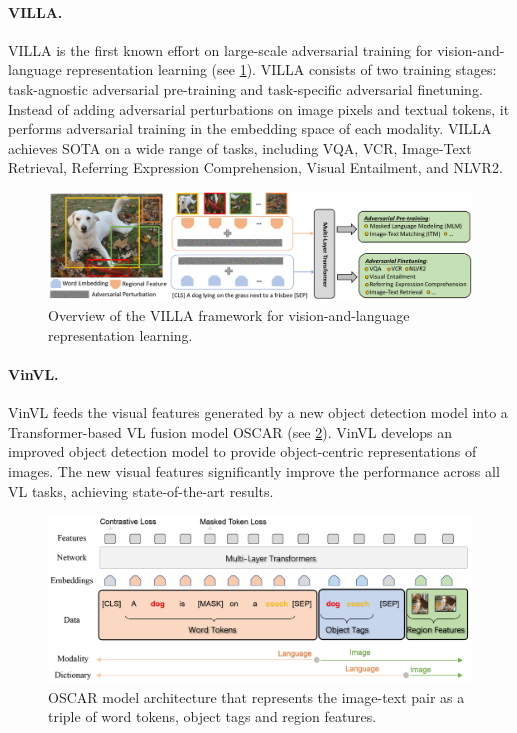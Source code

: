 \paragraph{VILLA.} VILLA \cite{gan2020villa} is the first known effort on large-scale adversarial training for vision-and-language representation learning (see \cref{fig:villa}). VILLA consists of two training stages: task-agnostic adversarial pre-training and task-specific adversarial finetuning. Instead of adding adversarial perturbations on image pixels and textual tokens, it performs adversarial training in the embedding space of each modality. VILLA achieves SOTA on a wide range of tasks, including VQA, VCR, Image-Text Retrieval, Referring Expression Comprehension, Visual Entailment, and NLVR2.

\begin{figure}[ht]
    \centering
    \includegraphics[width=\linewidth]{images/models/villa.png}
    \caption{Overview of the VILLA framework for vision-and-language representation learning.}
    \label{fig:villa}
\end{figure}

\paragraph{VinVL.} VinVL \cite{zhang2021vinvl} feeds the visual features generated by a new object detection model into a Transformer-based VL fusion model OSCAR \cite{li2020oscar} (see \cref{fig:oscar}). VinVL develops an improved object detection model to provide object-centric representations of images. The new visual features significantly improve the performance across all VL tasks, achieving state-of-the-art results.

\begin{figure}[ht]
    \centering
    \includegraphics[width=\linewidth]{images/models/oscar.png}
    \caption{OSCAR model architecture that represents the image-text pair as a triple of word tokens, object tags and region features.}
    \label{fig:oscar}
\end{figure}

